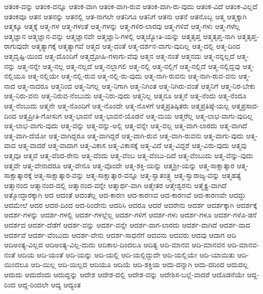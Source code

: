 {ಆತಂಕ-ವನ್ನು
ಆತಂಕ-ವನ್ನೂ
ಆತಂಕ-ವಾಗಿ
ಆತಂಕ-ವಾಗಿ-ರುವ
ಆತಂಕ-ವಾಗಿ-ರು-ವುದು
ಆತಂಕ-ವಿದೆ
ಆತಂಕ-ವಿಲ್ಲದೆ
ಆತಂಕವೂ
ಆತನ
ಆತನನ್ನು
ಆತನಲ್ಲಿ
ಆತ-ನಾಗಲೇ
ಆತನಿಗೂ
ಆತನಿಗೆ
ಆತನು
ಆತನೆ
ಆತನೊಬ್ಬ
ಆತ್ಮ
ಆತ್ಮಕ್ಕಾಗಿ
ಆತ್ಮಕ್ಕೂ
ಆತ್ಮಕ್ಕೆ
ಆತ್ಮ-ಗಳ
ಆತ್ಮ-ಗಳಂತೆ
ಆತ್ಮ-ಗಳನ್ನು
ಆತ್ಮ-ಗಳಿರ-ಲಾರವು
ಆತ್ಮ-ಗಳಿವೆ
ಆತ್ಮ-ಗಳು
ಆತ್ಮ-ಗಳೆಲ್ಲ
ಆತ್ಮಜ್ಞಾನ
ಆತ್ಮಜ್ಞಾನ-ವನ್ನು
ಆತ್ಮಜ್ಞಾನವೇ
ಆತ್ಮಜ್ಞಾನಿ-ಗಳಲ್ಲಿ
ಆತ್ಮಜ್ಯೋತಿ-ಯನ್ನು
ಆತ್ಮತೃಪ್ತ
ಆತ್ಮತೃಪ್ತ-ನಾಗಿ
ಆತ್ಮತೃಪ್ತ-ರಾಗುವುದೇ
ಆತ್ಮತ್ಯಾಗಕ್ಕೆ
ಆತ್ಮತ್ಯಾಗವೆ
ಆತ್ಮದ
ಆತ್ಮ-ದಂತೆ
ಆತ್ಮ-ದರ್ಶನ-ವಾಗು-ವುದಿಲ್ಲ
ಆತ್ಮ-ದಲ್ಲಿ
ಆತ್ಮ-ದಿಂದ
ಆತ್ಮದೃಷ್ಟಿ-ಯಿಂದ
ಆತ್ಮ-ದೊಂದಿಗೆ
ಆತ್ಮದ್ರೋಹಿ-ಗಳಾಗು-ವೆವು
ಆತ್ಮನ
ಆತ್ಮ-ನಂತೆ
ಆತ್ಮನದು
ಆತ್ಮ-ನನ್ನಲ್ಲದೆ
ಆತ್ಮ-ನನ್ನು
ಆತ್ಮ-ನನ್ನೇ
ಆತ್ಮ-ನಲ್ಲ
ಆತ್ಮ-ನಲ್ಲದೆ
ಆತ್ಮ-ನಲ್ಲಾಗಲಿ
ಆತ್ಮ-ನಲ್ಲಿ
ಆತ್ಮ-ನಲ್ಲಿಗೆ
ಆತ್ಮ-ನಲ್ಲಿದೆ
ಆತ್ಮ-ನಲ್ಲಿದ್ದವು
ಆತ್ಮ-ನಲ್ಲಿಯೂ
ಆತ್ಮ-ನಲ್ಲಿಯೇ
ಆತ್ಮ-ನಲ್ಲಿ-ರುವ
ಆತ್ಮ-ನಲ್ಲಿ-ರು-ವುದು
ಆತ್ಮ-ನಾಗಿ-ರುವನು
ಆತ್ಮ-ನಾಗಿ-ರುವ-ವನು
ಆತ್ಮ-ನಾದ
ಆತ್ಮ-ನಾದರೂ
ಆತ್ಮನಿಂದ
ಆತ್ಮ-ನಿಗಲ್ಲ
ಆತ್ಮ-ನಿಗಾಗಿ
ಆತ್ಮ-ನಿಗಿಂತ
ಆತ್ಮ-ನಿಗಿರು-ವಂತೆ
ಆತ್ಮನಿಗೆ
ಆತ್ಮ-ನಿರ-ಬೇಕು
ಆತ್ಮ-ನಿರು-ವನು
ಆತ್ಮ-ನಿರುವ-ನೆಂಬುದು
ಆತ್ಮ-ನಿರು-ವುದು
ಆತ್ಮನಿಲ್ಲ
ಆತ್ಮನೂ
ಆತ್ಮನೆ
ಆತ್ಮ-ನೆಂದು
ಆತ್ಮ-ನೆಂದೂ
ಆತ್ಮ-ನೆಂಬುದು
ಆತ್ಮನೇ
ಆತ್ಮ-ನೊಂದಿಗೆ
ಆತ್ಮ-ನೊಂದೇ
ಆತ್ಮ-ನೊಳಗೆ
ಆತ್ಮಪ್ರತಿಷ್ಠಿತರು
ಆತ್ಮಪ್ರತಿಷ್ಠೆ-ಯಲ್ಲ
ಆತ್ಮಪ್ರಸಾದ-ದಿಂದ
ಆತ್ಮಪ್ರೀತಿ-ಗೋಸುಗ
ಆತ್ಮ-ಭಾವನೆ
ಆತ್ಮ-ಭಾವನೆ-ಯೊಡನೆ
ಆತ್ಮ-ಮಯ
ಆತ್ಮರೆಲ್ಲ
ಆತ್ಮ-ಲಾಭ-ವಾಗು-ವುದಿಲ್ಲ
ಆತ್ಮ-ಲಾಭ-ವಾಗು-ವುದು
ಆತ್ಮ-ವನ್ನು
ಆತ್ಮ-ವನ್ನು-ಅಲ್ಲಿ
ಆತ್ಮ-ವನ್ನೇ
ಆತ್ಮ-ವಲ್ಲ
ಆತ್ಮ-ವಾಗ-ಲಾರದು
ಆತ್ಮ-ವಾಗಿದೆ
ಆತ್ಮ-ವಾಗಿ-ದೆಯೋ
ಆತ್ಮ-ವಾಗಿದ್ದರೂ
ಆತ್ಮ-ವಾಗಿದ್ದರೆ
ಆತ್ಮ-ವಾಗಿ-ರುವ
ಆತ್ಮ-ವಾಗಿ-ರುವನು
ಆತ್ಮ-ವಾಗು-ವುದು
ಆತ್ಮ-ವಾದ
ಆತ್ಮ-ವಾದರೆ
ಆತ್ಮ-ವಾದಾಗ
ಆತ್ಮ-ವಿಕಾಸ
ಆತ್ಮ-ವಿಕಾಸಕ್ಕೆ
ಆತ್ಮ-ವಿದೆ
ಆತ್ಮ-ವಿದ್ದರೆ
ಆತ್ಮ-ವಿರು-ವುದು
ಆತ್ಮವು
ಆತ್ಮವೂ
ಆತ್ಮವೆ
ಆತ್ಮ-ವೆಂದ-ರೇನು
ಆತ್ಮ-ವೆಂದು
ಆತ್ಮ-ವೆಂಬ
ಆತ್ಮ-ವೆಂಬು-ದಿದೆ
ಆತ್ಮ-ವೆಂಬುದು
ಆತ್ಮ-ವೆನ್ನು-ವುದು
ಆತ್ಮವೇ
ಆತ್ಮ-ವೇನಾದರೂ
ಆತ್ಮ-ವೇನೂ
ಆತ್ಮ-ವೊಂದೇ
ಆತ್ಮ-ಶಕ್ತಿ-ಯನ್ನು
ಆತ್ಮಶ್ರೀ-ಯನ್ನು
ಆತ್ಮ-ಸಾಕ್ಷಾತ್ಕಾರ
ಆತ್ಮ-ಸಾಕ್ಷಾತ್ಕಾರಕ್ಕೆ
ಆತ್ಮ-ಸಾಕ್ಷಾತ್ಕಾರ-ವನ್ನು
ಆತ್ಮ-ಸಾಕ್ಷಾತ್ಕಾರ-ವನ್ನೂ
ಆತ್ಮ-ಸ್ವಾತಂತ್ರ್ಯ
ಆತ್ಮ-ಸ್ವಾರಾಜ್ಯ-ವನ್ನು
ಆತ್ಮಹತ್ಯೆ
ಆತ್ಮಾನಂದ
ಆತ್ಮಾನಂದ-ದಲ್ಲಿ
ಆತ್ಮಾನಂದ-ವನ್ನೇ
ಆತ್ಮಾರ್ಥ-ವಾಗಿ
ಆತ್ಮೇತರ
ಆತ್ಮೇಶ್ವರನು
ಆತ್ಮೈಕ್ಯ-ವಾಗಿದೆ
ಆತ್ಮೋದ್ಧಾರಕ್ಕಾಗಿ
ಆದ
ಆದಂತೆ
ಆದಂತೆಲ್ಲ
ಆದ-ಕಾರಣ
ಆದ-ಕಾರಣವ
ಆದ-ಕಾರಣವೆ
ಆದ-ಕಾರಣವೇ
ಆದದ್ದು
ಆದಮೇಲೆ
ಆದರ
ಆದರ-ದಿಂದ
ಆದ-ರಿಂದೇನು
ಆದರಿಸಿ
ಆದರೂ
ಆದರೆ
ಆದರೇನು
ಆದರ್ಶ
ಆದರ್ಶಕ್ಕಾಗಿ
ಆದರ್ಶಕ್ಕೆ
ಆದರ್ಶ-ಗಳನ್ನು
ಆದರ್ಶ-ಗಳಲ್ಲಿ
ಆದರ್ಶ-ಗಳಲ್ಲೆಲ್ಲ
ಆದರ್ಶ-ಗಳಿಗೆ
ಆದರ್ಶ-ಗಳು
ಆದರ್ಶ-ಗಳೂ
ಆದರ್ಶ-ಗಳೊ-ಡನೆ
ಆದರ್ಶದ
ಆದರ್ಶ-ದೆಡೆಗೆ
ಆದರ್ಶ-ವನ್ನು
ಆದರ್ಶ-ವನ್ನೇ
ಆದರ್ಶ-ವಾಗ-ಲಾರದು
ಆದರ್ಶ-ವಾಗಿದೆ
ಆದರ್ಶ-ವಾದ
ಆದರ್ಶವೆ
ಆದರ್ಶ-ವೆಂಬುದು
ಆದರ್ಶ-ವೇನು
ಆದರ್ಶ-ಸಾಧನೆಗೆ
ಆದವನು
ಆದವರು
ಆದವು
ಆದಾಗ
ಆದಿ
ಆದಿಅಂತ್ಯ-ವಿಲ್ಲದ
ಆದಿಅಂತ್ಯ-ವಿಲ್ಲ-ದುದು
ಆದಿಕಾಲ-ದಿಂದಲೂ
ಆದಿತ್ಯ
ಆದಿ-ಮಾನವ
ಆದಿ-ಮಾನವನ
ಆದಿ-ಮಾನವ-ನಂತೆ
ಆದಿಯ
ಆದಿ-ಯಂತೆ
ಆದಿ-ಯನ್ನು
ಆದಿ-ಯಲ್ಲಿ
ಆದಿ-ಯಲ್ಲಿದ್ದುದೇ
ಆದಿ-ಯಲ್ಲಿಯೇ
ಆದಿ-ಯಾಯಿತು
ಆದಿ-ಯಿಂದಲೂ
ಆದಿ-ಯಿಲ್ಲ
ಆದಿ-ಯಿಲ್ಲದ
ಆದಿಯೂ
ಆದಿಯೆ
ಆದಿ-ಶಕ್ತಿಯ
ಆದು-ದನ್ನಾಗಿ
ಆದು-ದರಿಂದ
ಆದುದಲ್ಲ
ಆದುದು
ಆದುದೆಂದು
ಆದುದ್ದನ್ನು
ಆದೇಶ
ಆದೇಶ-ದಲ್ಲಿ
ಆದೇಶ-ವನ್ನು
ಆದೇಶಿಸ-ಬಲ್ಲೆ-ವಾದರೆ
ಆದೊಡನೆಯೇ
ಆದ್ದ-ರಿಂದ
ಆದ್ದ-ರಿಂದಲೇ
ಆದ್ಯ
ಆದ್ಯಂತ
}
